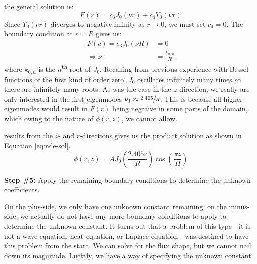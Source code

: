  the general solution is:
\begin{equation*}
F(r) = c_3J_0(\nu r) + c_4Y_0(\nu r)
\end{equation*}
Since $Y_0(\nu r)$ diverges to negative infinity as $r \to 0$, we must set $c_4 = 0$. The boundary condition at $r=R$ gives us:
\begin{align*}
F(c) = c_3 J_0(\nu R) &= 0 \\
\Rightarrow \nu &= \frac{k_{0,n}}{R}
\end{align*}
where $k_{0,n}$ is the $n$\textsuperscript{th} root of $J_0$.  Recalling from previous experience with Bessel functions of the first kind of order zero, $J_0$ oscillates infinitely many times so there are infinitely many roots.  As was the case in the $z$-direction, we really are only interested in the first eigenmodes $\nu_1 \approx \sfrac{2.405}{R}$.  This is because all higher eigenmodes would result in $F(r)$ being negative in some parts of the domain, which owing to the nature of $\phi(r,z)$, we cannot allow.

 results from the $z$- and $r$-directions gives us the product solution as shown in Equation \ref{eq:nde-sol}.
\begin{equation}
\phi(r,z) = A J_0(\frac{2.405 r}{R})\cos{(\frac{\pi z}{H})}
\label{eq:nde-sol}
\end{equation}

\vspace{0.25cm}

\noindent\textbf{Step \#5:} Apply the remaining boundary conditions to determine the unknown coefficients.

\vspace{0.25cm}

\noindent On the plus-side, we only have one unknown constant remaining; on the minus-side, we actually do not have any more boundary conditions to apply to determine the unknown constant.  It turns out that a problem of this type---it is not a wave equation, heat equation, or Laplace equation---was destined to have this problem from the start.  We can solve for the flux shape, but we cannot nail down its magnitude.  Luckily, we have a way of specifying the unknown constant.


